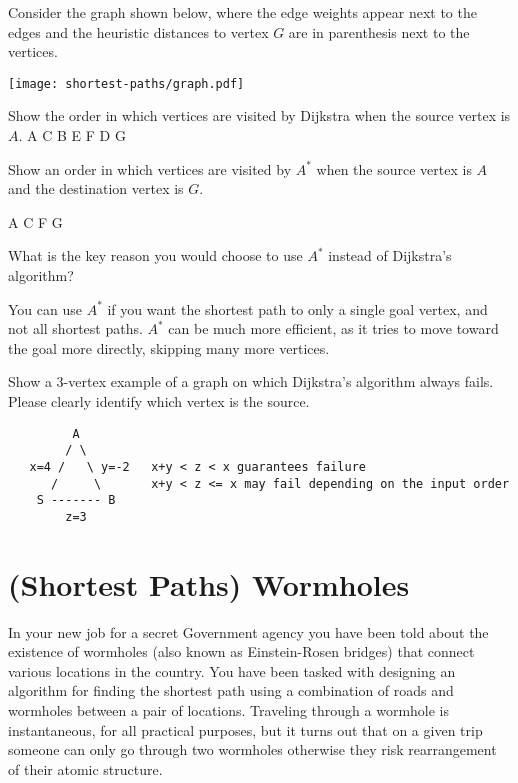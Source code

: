 \begin{problem}[6p]

Consider the graph shown below, where the edge weights appear next to
the edges and the heuristic distances to vertex $G$ are in parenthesis
next to the vertices.
\begin{center}
  \texttt{[image: shortest-paths/graph.pdf]}
\end{center}

\ask
Show the order in which vertices are visited by Dijkstra when the source
vertex is $A$.
\sol
A C B E F D G


\ask Show an order in which vertices are visited by $A^*$ when
the source vertex is $A$ and the destination vertex is $G$.

\sol
A C F G 

\end{problem}

\begin{problem}[4p]

\ask
What is the key reason you would choose to use $A^*$ instead of
Dijkstra's algorithm?

\sol
You can use $A^*$ if you want the shortest path to only a single goal vertex,
and not all shortest paths. $A^*$ can be much more efficient, as it tries to
move toward the goal more directly, skipping many more vertices.
\end{problem}

\begin{problem}[5p]
\ask
Show a $3$-vertex example of a graph on which Dijkstra's algorithm always
fails. Please clearly identify which vertex is the source.

\sol
\begin{verbatim}
         A 
        / \
   x=4 /   \ y=-2   x+y < z < x guarantees failure
      /     \       x+y < z <= x may fail depending on the input order
    S ------- B
        z=3
\end{verbatim}
\end{problem}


\section[12]{(Shortest Paths) Wormholes}

%



In your new job for a secret Government agency you have been told
about the existence of wormholes (also known as Einstein-Rosen
bridges) that connect various locations in the country.  You have been
tasked with designing an algorithm for finding the shortest path using
a combination of roads and wormholes between a pair of locations.
Traveling through a wormhole is instantaneous, for all practical
purposes, but it turns out that on a given trip someone can only go
through two wormholes otherwise they risk rearrangement of their
atomic structure.

